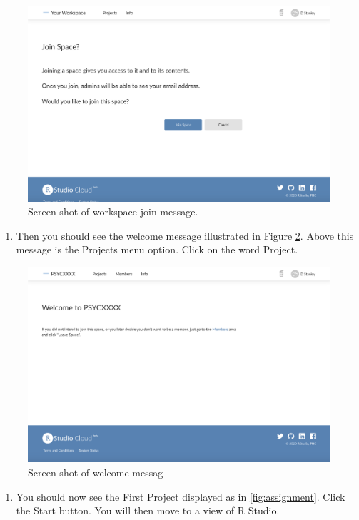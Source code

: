 \documentclass[
]{krantz}
\providecommand{\tightlist}{%
  \setlength{\itemsep}{0pt}\setlength{\parskip}{0pt}}
\begin{document}
\begin{figure}
\includegraphics[width=0.7\linewidth]{ch_first_time/images/screenshot_join} \caption{Screen shot of workspace join message.}\label{fig:join}
\end{figure}

\begin{enumerate}
\def\labelenumi{\arabic{enumi}.}
\setcounter{enumi}{3}
\tightlist
\item
  Then you should see the welcome message illustrated in Figure \ref{fig:welcome}. Above this message is the Projects menu option. Click on the word Project.
\end{enumerate}

\begin{figure}
\includegraphics[width=0.7\linewidth]{ch_first_time/images/screenshot_welcome} \caption{Screen shot of welcome messag}\label{fig:welcome}
\end{figure}

\begin{enumerate}
\def\labelenumi{\arabic{enumi}.}
\setcounter{enumi}{4}
\tightlist
\item
  You should now see the First Project displayed as in \ref{fig:assignment}. Click the Start button. You will then move to a view of R Studio.
\end{enumerate}
\end{document}
